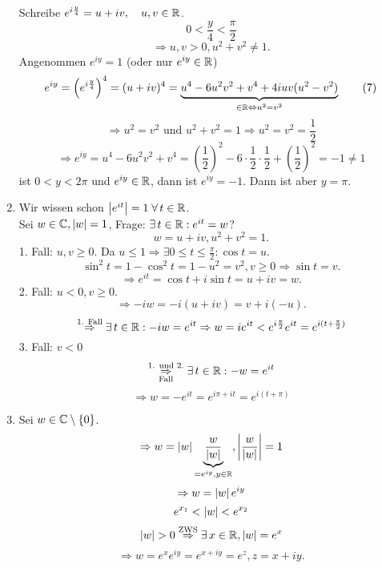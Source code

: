 \documentclass[../ana2.tex]{subfiles}
\begin{document}
\begin{bew}
\begin{enumerate}[label=(\alph*)]
Schreibe \( e^{i \frac{y}{4}} = u + iv, \quad u,v\in\mathbb{R} \).\\
\[ 0 < \frac{y}{4} < \frac{\pi}{2} \]
\[ \Rightarrow u,v > 0, u^2 + v^2 \neq 1. \]
Angenommen \( e^{iy} = 1 \) (oder nur \( e^{iy} \in \mathbb{R} \))
\[ e^{iy} = \left( e^{i \frac{y}{4}} \right)^4 
= (u+iv)^4 = \underbrace{u^4 - 6u^2 v^2 + v^4 + 4iuv(u^2 - v^2)}_{
    \in \mathbb{R} \Leftrightarrow u^2 = v^2 
} \tag{7} \]
\[ \Rightarrow u^2 = v^2 \text{ und } u^2+v^2 
= 1 \Rightarrow u^2 = v^2 = \frac{1}{2} \]
\[ \Rightarrow e^{iy} = u^4 - 6u^2v^2+v^4 
= \left(\frac{1}{2}\right)^2 - 6 \cdot \frac{1}{2} \cdot \frac{1}{2}
+ \left(\frac{1}{2}\right)^2 = -1 \neq 1 \]
\Dphp{} ist \( 0 < y < 2\pi \) und \( e^{iy} \in \mathbb{R} \), 
dann ist \( e^{iy} = -1 \). Dann ist aber \( y = \pi \).
\item Wir wissen schon \( \abs{e^{it}} = 1 \;\forall t \in\R \).\\
Sei \( w\in\mathbb{C}, \left|w\right| = 1 \), Frage: \( \exists t \in \R: e^{it} = w \)?\\
\[ w = u + iv, u^2 + v^2 = 1. \]
1. Fall: 
\( u, v \geq 0 \). Da \( u \leq 1 \Rightarrow 
\exists 0 \leq t \leq \frac{\pi}{2}: \cos t = u. \)
\[ \sin^2 t = 1 - \cos^2 t = 1 - u^2 = v^2, v \geq 0 
\Rightarrow \sin t = v. \]
\[ \Rightarrow e^{it} = \cos t + i \sin t = u + iv = w. \]
2. Fall: 
\( u < 0, v \geq 0 \). 
\[ \Rightarrow -i w = -i (u + iv) = v + i(-u). \]
\[ \oversett{1. Fall}{\Rightarrow} \exists t \in \R: 
-i w = e^{it} \Rightarrow w = i e^{it} < e^{i \frac{\pi}{2}} e^{it} 
= e^{i(t + \frac{\pi}{2})} \]
3. Fall: \( v < 0 \)
\[ \overundersett{1. und 2.}{Fall}{\Rightarrow} \exists t \in \R: -w = e^{it} \]
\[ \Rightarrow w = -e^{it} = e^{i\pi + it} = e^{i(t+\pi)} \]

\item Sei \( w \in \mathbb{C} \setminus \{0\} \).
\[ \Rightarrow w = \left|w\right| \underbrace{\frac{w}{\left|w\right|}}_{
    =e^{iy}, y\in\mathbb{R}}, 
\left|\frac{w}{\left|w\right|}\right| = 1 \]
\[ \Rightarrow w = \left|w\right| e^{iy} \]
\[ e^{x_1} < \left|w\right| < e^{x_2} \]
\[ \abs{w} > 0 \oversett{ZWS}{\Rightarrow} \exists x \in \R, \abs{w} = e^x \]
\[ \Rightarrow w = e^x e^{iy} = e^{x + iy} = e^z, z = x + iy. \]
\end{enumerate}
\end{bew}
\end{document}
